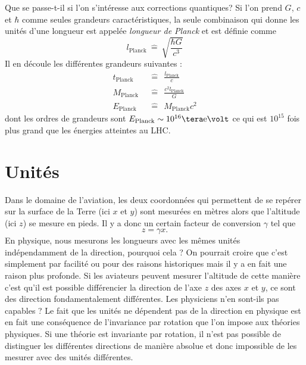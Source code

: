 \documentclass[a4paper,11pt]{report}
\theoremstyle{definition}
\theoremstyle{plain}
\theoremstyle{definition}
\theoremstyle{remark}
\begin{document}
        Que se passe-t-il si l'on s'intéresse aux corrections quantiques? Si l'on prend $G$, $c$ et $\hbar$ comme seules grandeurs caractéristiques, la seule combinaison qui donne les unités d'une longueur est appelée \textit{longueur de Planck} et est définie comme
        \begin{equation*}
            l_{\text{Planck}} ~\hat{=}~ \sqrt{\frac{\hbar G}{c^3}}
        \end{equation*}
        Il en découle les différentes grandeurs suivantes :
        \begin{align*}
            t_{\text{Planck}} ~&~\hat{=}~~ \frac{l_{\text{Planck}}}{c} \\
            M_{\text{Planck}} ~&~\hat{=}~~ \frac{c^2l_{\text{Planck}}}{G} \\
            E_{\text{Planck}} ~&~\hat{=}~~ M_{\text{Planck}}c^2
        \end{align*}
        dont les ordres de grandeurs sont $E_{\text{Planck}}\sim10^{16}\tera\text{e}\volt$ ce qui est $10^{15}$ fois plus grand que les énergies atteintes au LHC.
        
    \section{Unités}
    
        Dans le domaine de l'aviation, les deux coordonnées qui permettent de se repérer sur la surface de la Terre (ici $x$ et $y$) sont mesurées en mètres alors que l'altitude (ici $z$) se mesure en pieds. Il y a donc un certain facteur de conversion $\gamma$ tel que 
        \begin{equation}
            z = \gamma x.
        \end{equation}
        En physique, nous mesurons les longueurs avec les mêmes unités indépendamment de la direction, pourquoi cela ? On pourrait croire que c'est simplement par facilité ou pour des raisons historiques mais il y a en fait une raison plus profonde. Si les aviateurs peuvent mesurer l'altitude de cette manière c'est qu'il est possible différencier la direction de l'axe $z$ des axes $x$ et $y$, ce sont des direction fondamentalement différentes. Les physiciens n'en sont-ils pas capables ? Le fait que les unités ne dépendent pas de la direction en physique est en fait une conséquence de l'invariance par rotation que l'on impose aux théories physiques. Si une théorie est invariante par rotation, il n'est pas possible de distinguer les différentes directions de manière absolue et donc impossible de les mesurer avec des unités différentes.
        
\end{document}
